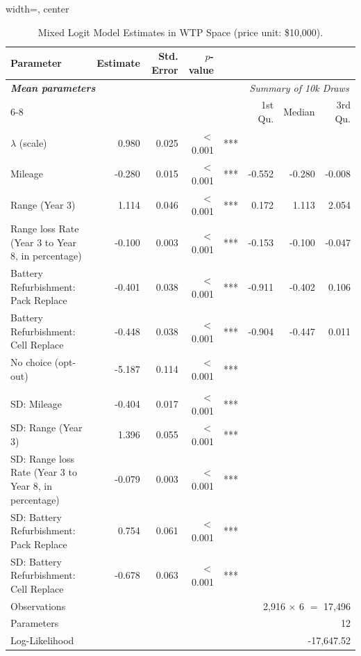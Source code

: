 \begin{table}[pos=H]
\selectfont
\caption{Mixed Logit Model Estimates in WTP Space (price unit: \$10,000).}
\label{table:mxl_results}
\begin{adjustbox}{width=\textwidth, center}

\begin{tabular}{lrrrlrrr}
\toprule
Parameter & Estimate & Std. Error & $p$-value &  &  &  & \\
\midrule
\multicolumn{5}{l}{\textbf{\textit{Mean parameters}}} & \multicolumn{3}{c}{\textit{Summary of 10k Draws}}\\
\cmidrule(l){6-8}
 & & & & & 1st Qu. & Median & 3rd Qu.\\[1.5ex]
$\lambda$ (scale) & 0.980 & 0.025 & $<$0.001 & *** &  &  & \\
Mileage & -0.280 & 0.015 & $<$0.001 & *** & -0.552 & -0.280 & -0.008\\
Range (Year 3) & 1.114 & 0.046 & $<$0.001 & *** & 0.172 & 1.113 & 2.054\\
Range loss Rate (Year 3 to Year 8, in percentage) & -0.100 & 0.003 & $<$0.001 & *** & -0.153 & -0.100 & -0.047\\
Battery Refurbishment: Pack Replace & -0.401 & 0.038 & $<$0.001 & *** & -0.911 & -0.402 & 0.106\\
Battery Refurbishment: Cell Replace & -0.448 & 0.038 & $<$0.001 & *** & -0.904 & -0.447 & 0.011\\
No choice (opt-out) & -5.187 & 0.114 & $<$0.001 & *** &  &  & \\
\addlinespace[1.5ex]\multicolumn{8}{l}{\textbf{\textit{Standard deviation}}}\\[1.5ex]
SD: Mileage & -0.404 & 0.017 & $<$0.001 & *** &  &  & \\
SD: Range (Year 3) & 1.396 & 0.055 & $<$0.001 & *** &  &  & \\
SD: Range loss Rate (Year 3 to Year 8, in percentage) & -0.079 & 0.003 & $<$0.001 & *** &  &  & \\
SD: Battery Refurbishment: Pack Replace & 0.754 & 0.061 & $<$0.001 & *** &  &  & \\
SD: Battery Refurbishment: Cell Replace & -0.678 & 0.063 & $<$0.001 & *** &  &  & \\
\midrule
\multicolumn{4}{l}{Observations} & \multicolumn{4}{r}{2,916 $\times$ 6 $=$ 17,496}\\
\multicolumn{4}{l}{Parameters} & \multicolumn{4}{r}{12}\\
\multicolumn{4}{l}{Log-Likelihood} & \multicolumn{4}{r}{-17,647.52}\\

\end{tabular}
\end{adjustbox}
\end{table}
